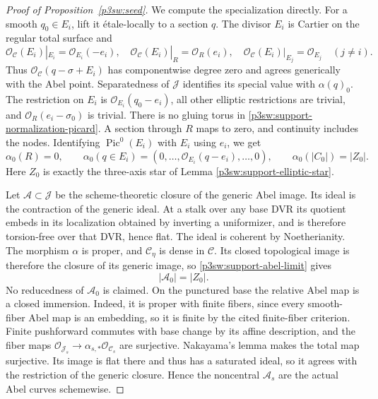 \documentclass[11pt]{article}
\numberwithin{equation}{section}
\begin{document}
\begin{proof}[Proof of Proposition~\ref{p3sw:seed}]
We compute the specialization directly.  For a smooth \(q_0\in E_i\),
lift it \'etale-locally to a section \(q\).  The divisor \(E_i\) is
Cartier on the regular total surface and
\begin{equation}
 \mathcal O_{\mathcal C}(E_i)|_{E_i}=\mathcal O_{E_i}(-e_i),
 \quad
 \mathcal O_{\mathcal C}(E_i)|_R=\mathcal O_R(e_i),
 \quad
 \mathcal O_{\mathcal C}(E_i)|_{E_j}=\mathcal O_{E_j}\quad(j\ne i).
 \label{p3sw:support-tail-twist}
\end{equation}
Thus \(\mathcal O_{\mathcal C}(q-\sigma+E_i)\) has componentwise
degree zero and agrees generically with the Abel point.
Separatedness of \(\mathcal J\) identifies its special value with
\(\alpha(q)_0\).  The restriction on \(E_i\) is
\(\mathcal O_{E_i}(q_0-e_i)\), all other elliptic restrictions are
trivial, and \(\mathcal O_R(e_i-\sigma_0)\) is trivial.
There is no gluing torus in \eqref{p3sw:support-normalization-picard}.  A section through \(R\) maps to
zero, and continuity includes the nodes.  Identifying
\(\operatorname{Pic}^0(E_i)\) with \(E_i\) using \(e_i\), we get
\begin{equation}
 \alpha_0(R)=0,\qquad
 \alpha_0(q\in E_i)=(0,\ldots,\mathcal O_{E_i}(q-e_i),\ldots,0),
 \qquad
 \alpha_0(|C_0|)=|Z_0|.
 \label{p3sw:support-abel-limit}
\end{equation}
Here \(Z_0\) is exactly the three-axis star of Lemma
\ref{p3sw:support-elliptic-star}.

Let \(\mathcal A\subset\mathcal J\) be the scheme-theoretic closure of
the generic Abel image.  Its ideal is the contraction of the generic
ideal.  At a stalk over any base DVR its quotient embeds in its
localization obtained by inverting a uniformizer, and is therefore
torsion-free over that DVR, hence flat.  The ideal is coherent by
Noetherianity.  The morphism \(\alpha\) is proper, and
\(\mathcal C_\eta\) is dense in \(\mathcal C\).  Its closed topological image is
therefore the closure of its generic image, so \eqref{p3sw:support-abel-limit} gives
\begin{equation}
 |\mathcal A_0|=|Z_0|.
 \label{p3sw:support-closure-support}
\end{equation}
No reducedness of \(\mathcal A_0\) is claimed.  On the punctured base
the relative Abel map is a closed immersion.  Indeed, it is proper
with finite fibers, since every smooth-fiber Abel map is an
embedding, so it is finite by the cited finite-fiber criterion.
Finite pushforward commutes with base change by its affine description,
and the fiber maps
\(\mathcal O_{\mathcal J_s}\to\alpha_{s,*}\mathcal O_{\mathcal C_s}\)
are surjective.  Nakayama's lemma makes the total map surjective.
Its image is flat there and thus has a saturated ideal, so it agrees
with the restriction of the generic closure.  Hence the noncentral
\(\mathcal A_s\) are the actual Abel curves schemewise.


\end{proof}
\end{document}
